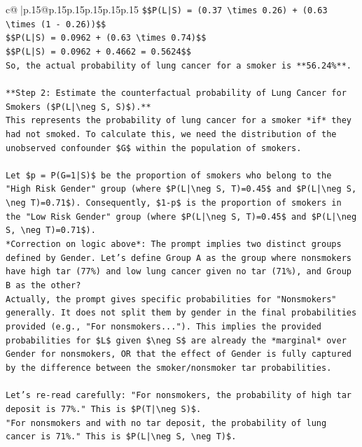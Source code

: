 \documentclass{article}
\begin{document}
{\begin{supertabular}{c@{$\;$}|p{.15\linewidth}@{}p{.15\linewidth}p{.15\linewidth}p{.15\linewidth}p{.15\linewidth}p{.15\linewidth}}
{{{\texttt{\$\$P(L|S) = (0.37 \textbackslash{}times 0.26) + (0.63 \textbackslash{}times (1 {-} 0.26))\$\$} \\
\texttt{\$\$P(L|S) = 0.0962 + (0.63 \textbackslash{}times 0.74)\$\$} \\
\texttt{\$\$P(L|S) = 0.0962 + 0.4662 = 0.5624\$\$} \\
\texttt{So, the actual probability of lung cancer for a smoker is **56.24\%**.} \\
\\ 
\texttt{**Step 2: Estimate the counterfactual probability of Lung Cancer for Smokers (\$P(L|\textbackslash{}neg S, S)\$).**} \\
\texttt{This represents the probability of lung cancer for a smoker *if* they had not smoked. To calculate this, we need the distribution of the unobserved confounder \$G\$ within the population of smokers.} \\
\\ 
\texttt{Let \$p = P(G=1|S)\$ be the proportion of smokers who belong to the "High Risk Gender" group (where \$P(L|\textbackslash{}neg S, T)=0.45\$ and \$P(L|\textbackslash{}neg S, \textbackslash{}neg T)=0.71\$). Consequently, \$1{-}p\$ is the proportion of smokers in the "Low Risk Gender" group (where \$P(L|\textbackslash{}neg S, T)=0.45\$ and \$P(L|\textbackslash{}neg S, \textbackslash{}neg T)=0.71\$).} \\
\texttt{*Correction on logic above*: The prompt implies two distinct groups defined by Gender. Let's define Group A as the group where nonsmokers have high tar (77\%) and low lung cancer given no tar (71\%), and Group B as the other?} \\
\texttt{Actually, the prompt gives specific probabilities for "Nonsmokers" generally. It does not split them by gender in the final probabilities provided (e.g., "For nonsmokers..."). This implies the provided probabilities for \$L\$ given \$\textbackslash{}neg S\$ are already the *marginal* over Gender for nonsmokers, OR that the effect of Gender is fully captured by the difference between the smoker/nonsmoker tar probabilities.} \\
\\ 
\texttt{Let's re{-}read carefully: "For nonsmokers, the probability of high tar deposit is 77\%." This is \$P(T|\textbackslash{}neg S)\$.} \\
\texttt{"For nonsmokers and with no tar deposit, the probability of lung cancer is 71\%." This is \$P(L|\textbackslash{}neg S, \textbackslash{}neg T)\$.} \\
}}}
\end{supertabular}}
\end{document}

